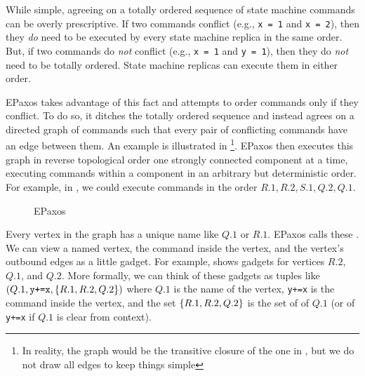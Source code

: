 \documentclass{mwhittaker}
\theoremstyle{definition}
\begin{document}
While simple, agreeing on a totally ordered sequence of state machine commands
can be overly prescriptive. If two commands conflict (e.g., \texttt{x = 1} and
\texttt{x = 2}), then they \emph{do} need to be executed by every state machine
replica in the same order. But, if two commands do \emph{not} conflict (e.g.,
\texttt{x = 1} and \texttt{y = 1}), then they do \emph{not} need to be totally
ordered.  State machine replicas can execute them in either order.

EPaxos takes advantage of this fact and attempts to order commands only if they
conflict. To do so, it ditches the totally ordered sequence and instead agrees
on a directed graph of commands such that every pair of conflicting commands
have an edge between them. An example is illustrated in %
\footnote{%
  In reality, the graph would be the transitive closure of the one in
  , but we do not draw all edges to keep things simple
}.
EPaxos then executes this graph in reverse topological order one strongly
connected component at a time, executing commands within a component in an
arbitrary but deterministic order. For example, in , we
could execute commands in the order $R.1, R.2, S.1, Q.2, Q.1$.

\begin{figure}[h]
  \centering
  \caption{EPaxos}
\end{figure}

Every vertex in the graph has a unique name like $Q.1$ or $R.1$. EPaxos calls
these . We can view a named vertex, the command inside the
vertex, and the vertex's outbound edges as a little gadget. For example,
 shows gadgets for vertices $R.2$, $Q.1$, and $Q.2$.
%
More formally, we can think of these gadgets as tuples like $(Q.1,
\texttt{y+=x}, \{R.1, R.2, Q.2\})$ where $Q.1$ is the name of the vertex,
\texttt{y+=x} is the command inside the vertex, and the set $\{R.1, R.2,
Q.2\}$ is the set of  of $Q.1$ (or of \texttt{y+=x} if
$Q.1$ is clear from context).
\end{document}
